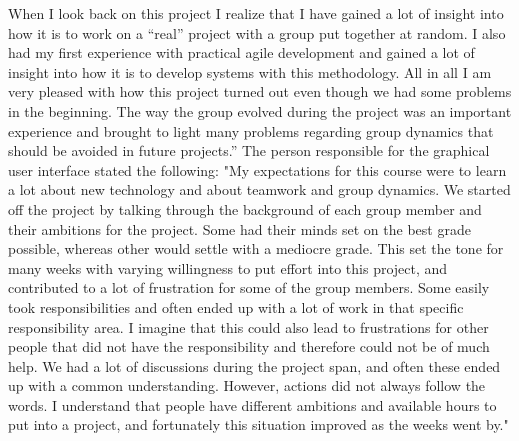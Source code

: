 When I look back on this project I realize that I have gained a lot of insight into how it is to work on a “real” project with a group put together at random. I also had my first experience with practical agile development and gained a lot of insight into how it is to develop systems with this methodology. All in all I am very pleased with how this project turned out even though we had some problems in the beginning. The way the group evolved during the project was an important experience and brought to light many problems regarding group dynamics that should be avoided in future projects.''
\newline
\newline
The person responsible for the graphical user interface stated the following:
\newline
\newline
"My expectations for this course were to learn a lot about new technology and about teamwork and group dynamics. We started off the project by talking through the background of each group member and their ambitions for the project. Some had their minds set on the best grade possible, whereas other would settle with a mediocre grade. This set the tone for many weeks with varying willingness to put effort into this project, and contributed to a lot of frustration for some of the group members. Some easily took responsibilities and often ended up with a lot of work in that specific responsibility area. I imagine that this could also lead to frustrations for other people that did not have the responsibility and therefore could not be of much help. We had a lot of discussions during the project span, and often these ended up with a common understanding. However, actions did not always follow the words. I understand that people have different ambitions and available hours to put into a project, and fortunately this situation improved as the weeks went by." 


